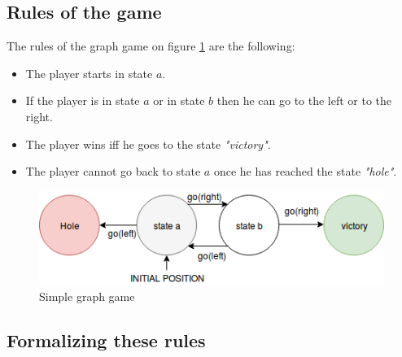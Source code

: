 
\subsection{Rules of the game}

The rules of the graph game on figure \ref{fig:agent} are the following:
\begin{itemize}
\item The player starts in state $a$.
\item If the player is in state $a$ or in state $b$ then he can go to the left or to the right.
\item The player wins iff he goes to the state \textit{"victory"}.
\item The player cannot go back to state $a$ once he has reached the state \textit{"hole"}.
\end{itemize}

\begin{figure}[h]
\centering
\includegraphics[width = 0.8\hsize]{figures/diagram1.png}
\caption{Simple graph game}
\label{fig:agent}
\end{figure}

\subsection{Formalizing these rules}

